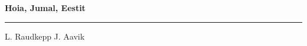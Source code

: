 \documentclass[10pt]{book}
\begin{document}
{
  \samepage
  \raggedbottom
  \raggedright
  \sloppy


  \vspace{0.2in}

  \noindent\begin{minipage}{.1\textwidth}
    \hfill\vspace{0.1in}
  \end{minipage}%
  \noindent\begin{minipage}{.8\textwidth}
    \centering
    \bfseries
    \large Hoia, Jumal, Eestit
  \end{minipage}%
  \noindent\begin{minipage}{.1\textwidth}
      \hfill\vspace{0.1in}
  \end{minipage}

  \nopagebreak[4]
  \vspace{0.1in}
  \nopagebreak[4]
  \hrule height 0.05ex
  \nopagebreak[4]
  \vspace{-0.05in}

  {\footnotesize L. Raudkepp \hfill J. Aavik }\\
  \vspace{0.01in}



}
\end{document}
